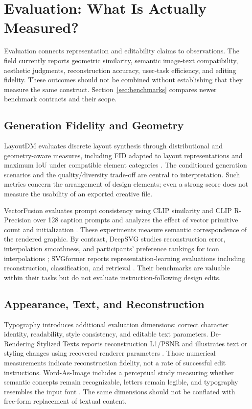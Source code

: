 \section{Evaluation: What Is Actually Measured?}
\label{sec:evaluation}
Evaluation connects representation and editability claims to observations. The field currently reports geometric similarity, semantic image-text compatibility, aesthetic judgments, reconstruction accuracy, user-task efficiency, and editing fidelity. These outcomes should not be combined without establishing that they measure the same construct. Section~\ref{sec:benchmarks} compares newer benchmark contracts and their scope.



\subsection{Generation Fidelity and Geometry}
LayoutDM evaluates discrete layout synthesis through distributional and geometry-aware measures, including FID adapted to layout representations and maximum IoU under compatible element categories \citep{layoutdm2023}. The conditioned generation scenarios and the quality/diversity trade-off are central to interpretation. Such metrics concern the arrangement of design elements; even a strong score does not measure the usability of an exported creative file.

VectorFusion evaluates prompt consistency using CLIP similarity and CLIP R-Precision over 128 caption prompts and analyzes the effect of vector primitive count and initialization \citep{vectorfusion2023}. These experiments measure semantic correspondence of the rendered graphic. By contrast, DeepSVG studies reconstruction error, interpolation smoothness, and participants' preference rankings for icon interpolations \citep{deepsvg2020}; SVGformer reports representation-learning evaluations including reconstruction, classification, and retrieval \citep{svgformer2023}. Their benchmarks are valuable within their tasks but do not evaluate instruction-following design edits.

\subsection{Appearance, Text, and Reconstruction}
Typography introduces additional evaluation dimensions: correct character identity, readability, style consistency, and editable text parameters. De-Rendering Stylized Texts reports reconstruction L1/PSNR and illustrates text or styling changes using recovered renderer parameters \citep{derendering2021}. Those numerical measurements indicate reconstruction fidelity, not a rate of successful edit instructions. Word-As-Image includes a perceptual study measuring whether semantic concepts remain recognizable, letters remain legible, and typography resembles the input font \citep{wordasimage2023}. The same dimensions should not be conflated with free-form replacement of textual content.

